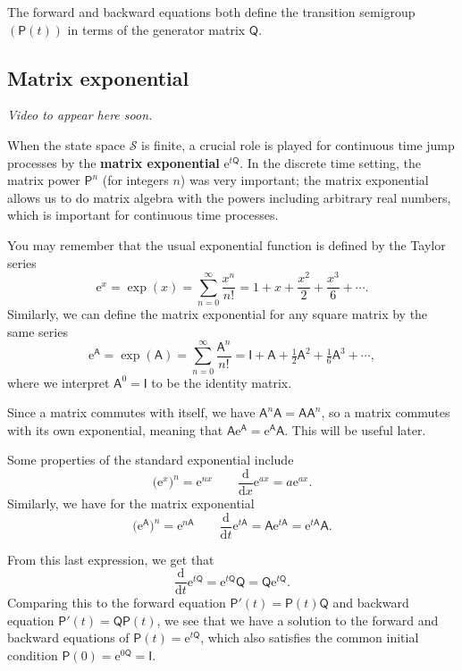 \documentclass[
  a4paper,
]{article}
\theoremstyle{definition}
\theoremstyle{definition}
\theoremstyle{definition}
\theoremstyle{remark}
\begin{document}
The forward and backward equations both define the transition semigroup \((\mathsf P(t))\) in terms of the generator matrix \(\mathsf Q\).

\hypertarget{matrix-exp}{%
\subsection{Matrix exponential}\label{matrix-exp}}

\emph{Video to appear here soon.}

When the state space \(\mathcal S\) is finite, a crucial role is played for continuous time jump processes by the \textbf{matrix exponential} \(\mathrm{e}^{t\mathsf Q}\). In the discrete time setting, the matrix power \(\mathsf P^n\) (for integers \(n\)) was very important; the matrix exponential allows us to do matrix algebra with the powers including arbitrary real numbers, which is important for continuous time processes.

You may remember that the usual exponential function is defined by the Taylor series
\[ \mathrm{e}^x = \exp(x) = \sum_{n=0}^\infty \frac{x^n}{n!} = 1 + x + \frac{x^2}{2} + \frac{x^3}{6} + \cdots. \]
Similarly, we can define the matrix exponential for any square matrix by the same series
\[ \mathrm{e}^{\mathsf A} = \exp({\mathsf A}) = \sum_{n=0}^\infty \frac{{\mathsf A}^n}{n!} = {\mathsf I} + {\mathsf A} + \tfrac12 \mathsf A^2+ \tfrac16 \mathsf A^3 + \cdots, \]
where we interpret \(\mathsf A^0 = \mathsf I\) to be the identity matrix.

Since a matrix commutes with itself, we have \(\mathsf {A}^n \mathsf A = \mathsf{AA}^n\), so a matrix commutes with its own exponential, meaning that \(\mathsf A \mathrm{e}^{\mathsf A} = \mathrm{e}^{\mathsf A} \mathsf A\). This will be useful later.

Some properties of the standard exponential include
\[ (\mathrm{e}^x\big)^n = \mathrm{e}^{nx} \qquad \frac{\mathrm d}{\mathrm d x} \mathrm{e}^{ax} = a \mathrm{e}^{ax} . \]
Similarly, we have for the matrix exponential
\[ (\mathrm{e}^{\mathsf A}\big)^n = \mathrm{e}^{n{\mathsf A}} \qquad \frac{\mathrm d}{\mathrm d t} \mathrm{e}^{t{\mathsf A}} = {\mathsf A} \mathrm{e}^{t{\mathsf A}} = \mathrm{e}^{t{\mathsf A}} {\mathsf A} . \]

From this last expression, we get that
\[ \frac{\mathrm d}{\mathrm d t} \mathrm{e}^{t{\mathsf Q}} = \mathrm{e}^{t{\mathsf Q}} {\mathsf Q} = {\mathsf Q} \mathrm{e}^{t{\mathsf Q}}  . \]
Comparing this to the forward equation \(\mathsf P'(t) = \mathsf{P}(t) \mathsf Q\) and backward equation \(\mathsf{P}'(t) = \mathsf Q \mathsf{P}(t)\), we see that we have a solution to the forward and backward equations of \(\mathsf P(t) = \mathrm{e}^{t\mathsf Q}\), which also satisfies the common initial condition \(\mathsf P(0) = \mathrm{e}^{0\mathsf Q} = \mathsf I\).
\end{document}
